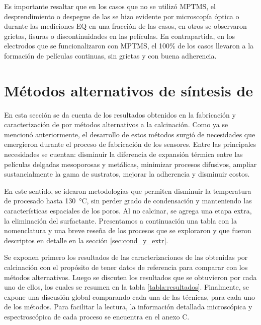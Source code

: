 			 Es importante resaltar que en los casos que no se utilizó MPTMS, el desprendimiento o despegue de las \pdm\space se hizo evidente por microscopía óptica o durante las mediciones EQ en una fracción de las casos, en otros se observaron grietas, fisuras o discontinuidades en las películas. En contrapartida, en los electrodos que se funcionalizaron con MPTMS, el 100\% de los casos llevaron a la formación de películas continuas, sin grietas y con buena adherencia.

\section{Métodos alternativos de síntesis de \pdm}
	
	 	 En esta sección se da cuenta de los resultados obtenidos en la fabricación y caracterización de \pdm\space por métodos alternativos a la calcinación. Como ya se mencionó anteriormente, el desarrollo de estos métodos surgió de necesidades que emergieron durante el proceso de fabricación de los sensores. Entre las principales necesidades se cuentan: disminuir la diferencia de expansión térmica entre las películas delgadas mesoporosas y metálicas, minimizar procesos difusivos, ampliar sustancialmente la gama de sustratos, mejorar la adherencia y disminuir costos.

		 En este sentido, se idearon metodologías que permiten disminuir la temperatura de procesado hasta \SI{130}{\celsius}, sin perder grado de condensación y manteniendo las características espaciales de los poros. Al no calcinar, se agrega una etapa extra, la eliminación del surfactante. Presentamos a continuación una tabla con la nomenclatura y una breve reseña de los procesos que se exploraron y que fueron descriptos en detalle en la sección \ref{sec:cond_y_extr}.

		 Se exponen primero los resultados de las caracterizaciones de las \pdm\space obtenidas por calcinación con el propósito de tener datos de referencia para comparar con los métodos alternativos. Luego se discuten los resultados que se obtuvieron por cada uno de ellos, los cuales se resumen en la tabla \ref{tabla:resultados}. Finalmente, se expone una discusión global comparando cada una de las técnicas, para cada uno de los métodos. Para facilitar la lectura, la información detallada microscópica y espectroscópica de cada proceso se encuentra en el anexo C.
	 
